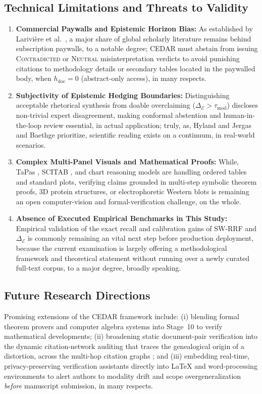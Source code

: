 \documentclass[sigconf]{acmart}
\begin{document}
\subsection{Technical Limitations and Threats to Validity}
\begin{enumerate}
\item \textbf{Commercial Paywalls and Epistemic Horizon Bias:} As established by Larivi{\`e}re et al.\ \cite{lariviere2015oligopoly}, a major share of global scholarly literature remains behind subscription paywalls, to a notable degree; CEDAR must abstain from issuing \textsc{Contradicted} or \textsc{Neutral} misinterpretation verdicts to avoid punishing citations to methodology details or secondary tables located in the paywalled body, when $h_{\text{doc}} = 0$ (abstract-only access), in many respects.
\item \textbf{Subjectivity of Epistemic Hedging Boundaries:} Distinguishing acceptable rhetorical synthesis from doable overclaiming ($\Delta_{\mathcal{E}} > \tau_{\text{mod}}$) discloses non-trivial expert disagreement, making conformal abstention and human-in-the-loop review essential, in actual application; truly, as, Hyland \cite{hyland1998hedging} and Jergas and Baethge \cite{jergas2015quotation} prioritize, scientific reading exists on a continuum, in real-world scenarios.
\item \textbf{Complex Multi-Panel Visuals and Mathematical Proofs:} While, TaPas \cite{herzig2020tapas}, SCITAB \cite{lu2023scitab}, and chart reasoning models \cite{akhtar2023reading} are handling ordered tables and standard plots, verifying claims grounded in multi-step symbolic theorem proofs, 3D protein structures, or electrophoretic Western blots is remaining an open computer-vision and formal-verification challenge, on the whole.
\item \textbf{Absence of Executed Empirical Benchmarks in This Study:} Empirical validation of the exact recall and calibration gains of SW-RRF and $\Delta_{\mathcal{E}}$ is commonly remaining an vital next step before production deployment, because the current examination is largely offering a methodological framework and theoretical statement without running over a newly curated full-text corpus, to a major degree, broadly speaking.
\end{enumerate}

\subsection{Future Research Directions}
Promising extensions of the CEDAR framework include: (i) blending formal theorem provers and computer algebra systems into Stage~10 to verify mathematical developments; (ii) broadening static document-pair verification into the dynamic citation-network auditing that traces the genealogical origin of a distortion, across the multi-hop citation graphs \cite{greenberg2009citation,simkin2003read}; and (iii) embedding real-time, privacy-preserving verification assistants directly into LaTeX and word-processing environments to alert authors to modality drift and scope overgeneralization \emph{before} manuscript submission, in many respects.
\end{document}
